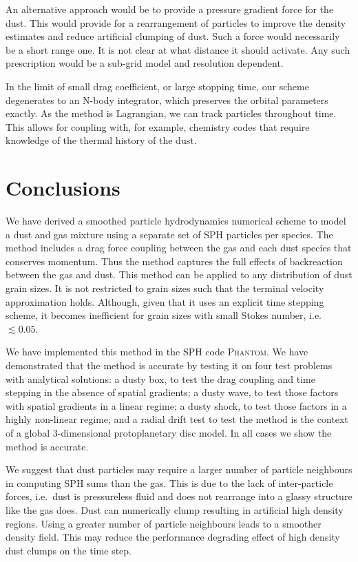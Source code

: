 \documentclass[fleqn,usenatbib]{mnras}
\begin{document}
An alternative approach would be to provide a pressure gradient force for the
dust. This would provide for a rearrangement of particles to improve the density
estimates and reduce artificial clumping of dust. Such a force would necessarily
be a short range one. It is not clear at what distance it should activate. Any
such prescription would be a sub-grid model and resolution dependent.

In the limit of small drag coefficient, or large stopping time, our scheme
degenerates to an N-body integrator, which preserves the orbital parameters
exactly. As the method is Lagrangian, we can track particles throughout time.
This allows for coupling with, for example, chemistry codes that require
knowledge of the thermal history of the dust.


\section{Conclusions}

We have derived a smoothed particle hydrodynamics numerical scheme to model a
dust and gas mixture using a separate set of SPH particles per species. The
method includes a drag force coupling between the gas and each dust species that
conserves momentum. Thus the method captures the full effects of backreaction
between the gas and dust. This method can be applied to any distribution of dust
grain sizes. It is not restricted to grain sizes such that the terminal velocity
approximation holds. Although, given that it uses an explicit time stepping
scheme, it becomes inefficient for grain sizes with small Stokes number, i.e.
\(\lesssim 0.05\).

We have implemented this method in the SPH code \textsc{Phantom}. We have
demonstrated that the method is accurate by testing it on four test problems
with analytical solutions: a dusty box, to test the drag coupling and time
stepping in the absence of spatial gradients; a dusty wave, to test those
factors with spatial gradients in a linear regime; a dusty shock, to test those
factors in a highly non-linear regime; and a radial drift test to test the
method is the context of a global 3-dimensional protoplanetary disc model. In
all cases we show the method is accurate.

We suggest that dust particles may require a larger number of particle
neighbours in computing SPH sums than the gas. This is due to the lack of
inter-particle forces, i.e.\ dust is pressureless fluid and does not rearrange
into a glassy structure like the gas does. Dust can numerically clump resulting
in artificial high density regions. Using a greater number of particle
neighbours leads to a smoother density field. This may reduce the performance
degrading effect of high density dust clumps on the time step.
\end{document}
